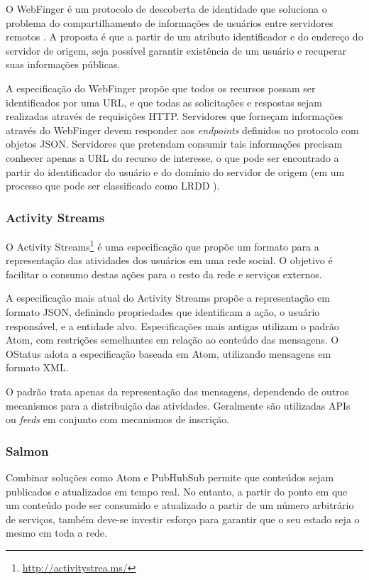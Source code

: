 \begin{sloppypar}
O WebFinger é um protocolo de descoberta de identidade que soluciona o problema do
compartilhamento de informações de usuários entre servidores remotos \cite{rfc7033}.
A proposta é que a partir de um atributo identificador e do endereço do servidor de
origem, seja possível garantir existência de um usuário e recuperar suas informações
públicas.
\end{sloppypar}

A especificação do WebFinger propõe que todos os recursos possam ser identificados
por uma URL, e que todas as solicitações e respostas sejam realizadas através de
requisições HTTP. Servidores que forneçam informações através do WebFinger devem
responder aos \textit{endpoints} definidos no protocolo com objetos JSON. Servidores
que pretendam consumir tais informações precisam conhecer apenas a URL do recurso de
interesse, o que pode ser encontrado a partir do identificador do usuário e do
domínio do servidor de origem (em um processo que pode ser classificado como LRDD
\cite{lrdd2010}). 

\subsubsection{Activity Streams}

O Activity Streams\footnote{\url{http://activitystrea.ms/}} é uma especificação que
propõe um formato para a representação das atividades dos usuários em uma rede
social. O objetivo é facilitar o consumo destas ações para o resto da rede e
serviços externos.

A especificação mais atual do Activity Streams propõe a representação em formato
JSON, definindo propriedades que identificam a ação, o usuário responsável, e a
entidade alvo. Especificações mais antigas utilizam o padrão Atom, com restrições
semelhantes em relação ao conteúdo das mensagens. O OStatus adota a especificação
baseada em Atom, utilizando mensagens em formato XML.

O padrão trata apenas da representação das mensagens, dependendo de outros
mecanismos para a distribuição das atividades. Geralmente são utilizadas APIs ou
\textit{feeds} em conjunto com mecanismos de inscrição.

\subsubsection{Salmon}

Combinar soluções como Atom e PubHubSub permite que conteúdos sejam publicados e
atualizados em tempo real. No entanto, a partir do ponto em que um conteúdo pode ser
consumido e atualizado a partir de um número arbitrário de serviços, também deve-se
investir esforço para garantir que o seu estado seja o mesmo em toda a rede.

